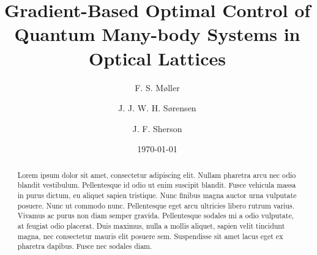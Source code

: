 \documentclass[%
 reprint,
 amsmath,amssymb,
 aps,
pra,
]{revtex4-1}
\begin{document}

\title{Gradient-Based Optimal Control of Quantum Many-body Systems in Optical Lattices}%

\author{F. S. M\o ller}
\author{J. J. W. H. S\o rensen}
\author{J. F. Sherson}
\date{\today}%

\begin{abstract}
Lorem ipsum dolor sit amet, consectetur adipiscing elit. Nullam pharetra arcu nec odio blandit vestibulum. Pellentesque id odio ut enim suscipit blandit. Fusce vehicula massa in purus dictum, eu aliquet sapien tristique. Nunc finibus magna auctor urna vulputate posuere. Nunc ut commodo nunc. Pellentesque eget arcu ultricies libero rutrum varius. Vivamus ac purus non diam semper gravida. Pellentesque sodales mi a odio vulputate, at feugiat odio placerat. Duis maximus, nulla a mollis aliquet, sapien velit tincidunt magna, nec consectetur mauris elit posuere sem. Suspendisse sit amet lacus eget ex pharetra dapibus. Fusce nec sodales diam.

\end{abstract}

\maketitle





%


%

\end{document}
